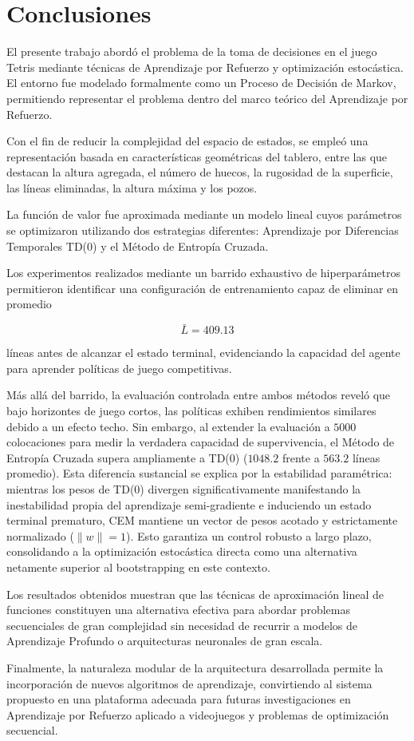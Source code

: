 \section{Conclusiones}
\label{sec:conclusiones}

El presente trabajo abordó el problema de la toma de decisiones en el juego Tetris mediante técnicas de Aprendizaje por Refuerzo y optimización estocástica. El entorno fue modelado formalmente como un Proceso de Decisión de Markov, permitiendo representar el problema dentro del marco teórico del Aprendizaje por Refuerzo.

Con el fin de reducir la complejidad del espacio de estados, se empleó una representación basada en características geométricas del tablero, entre las que destacan la altura agregada, el número de huecos, la rugosidad de la superficie, las líneas eliminadas, la altura máxima y los pozos.

La función de valor fue aproximada mediante un modelo lineal cuyos parámetros se optimizaron utilizando dos estrategias diferentes: Aprendizaje por Diferencias Temporales TD(0) y el Método de Entropía Cruzada.

Los experimentos realizados mediante un barrido exhaustivo de hiperparámetros permitieron identificar una configuración de entrenamiento capaz de eliminar en promedio

\begin{equation}
\bar{L}=409.13
\end{equation}

líneas antes de alcanzar el estado terminal, evidenciando la capacidad del agente para aprender políticas de juego competitivas.

Más allá del barrido, la evaluación controlada entre ambos métodos reveló que bajo horizontes de juego cortos, las políticas exhiben rendimientos similares debido a un efecto techo. Sin embargo, al extender la evaluación a $5000$ colocaciones para medir la verdadera capacidad de supervivencia, el Método de Entropía Cruzada supera ampliamente a TD(0) ($1048.2$ frente a $563.2$ líneas promedio). Esta diferencia sustancial se explica por la estabilidad paramétrica: mientras los pesos de TD(0) divergen significativamente manifestando la inestabilidad propia del aprendizaje semi-gradiente e induciendo un estado terminal prematuro, CEM mantiene un vector de pesos acotado y estrictamente normalizado ($\lVert w \rVert = 1$). Esto garantiza un control robusto a largo plazo, consolidando a la optimización estocástica directa como una alternativa netamente superior al bootstrapping en este contexto.

Los resultados obtenidos muestran que las técnicas de aproximación lineal de funciones constituyen una alternativa efectiva para abordar problemas secuenciales de gran complejidad sin necesidad de recurrir a modelos de Aprendizaje Profundo o arquitecturas neuronales de gran escala.

Finalmente, la naturaleza modular de la arquitectura desarrollada permite la incorporación de nuevos algoritmos de aprendizaje, convirtiendo al sistema propuesto en una plataforma adecuada para futuras investigaciones en Aprendizaje por Refuerzo aplicado a videojuegos y problemas de optimización secuencial.